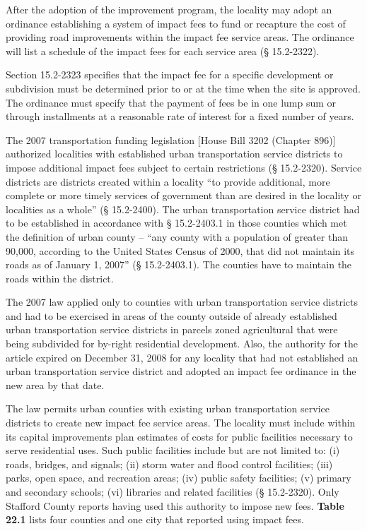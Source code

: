 \documentclass[
]{book}
\begin{document}
After the adoption of the improvement program, the locality may adopt an ordinance establishing a system of impact fees to fund or recapture the cost of providing road improvements within the impact fee service areas. The ordinance will list a schedule of the impact fees for each service area (§ 15.2-2322).

Section 15.2-2323 specifies that the impact fee for a specific development or subdivision must be determined prior to or at the time when the site is approved. The ordinance must specify that the payment of fees be in one lump sum or through installments at a reasonable rate of interest for a fixed number of years.

The 2007 transportation funding legislation {[}House Bill 3202 (Chapter 896){]} authorized localities with established urban transportation service districts to impose additional impact fees subject to certain restrictions (§ 15.2-2320). Service districts are districts created within a locality ``to provide additional, more complete or more timely services of government than are desired in the locality or localities as a whole'' (§ 15.2-2400). The urban transportation service district had to be established in accordance with § 15.2-2403.1 in those counties which met the definition of urban county -- ``any county with a population of greater than 90,000, according to the United States Census of 2000, that did not maintain its roads as of January 1, 2007'' (§ 15.2-2403.1). The counties have to maintain the roads within the district.

The 2007 law applied only to counties with urban transportation service districts and had to be exercised in areas of the county outside of already established urban transportation service districts in parcels zoned agricultural that were being subdivided for by-right residential development. Also, the authority for the article expired on December 31, 2008 for any locality that had not established an urban transportation service district and adopted an impact fee ordinance in the new area by that date.

The law permits urban counties with existing urban transportation service districts to create new impact fee service areas. The locality must include within its capital improvements plan estimates of costs for public facilities necessary to serve residential uses. Such public facilities include but are not limited to: (i) roads, bridges, and signals; (ii) storm water and flood control facilities; (iii) parks, open space, and recreation areas; (iv) public safety facilities; (v) primary and secondary schools; (vi) libraries and related facilities (§ 15.2-2320). Only Stafford County reports having used this authority to impose new fees. \textbf{Table 22.1} lists four counties and one city that reported using impact fees.
\end{document}
